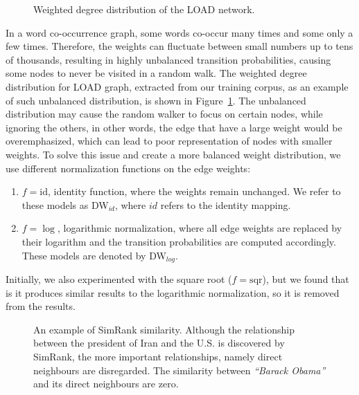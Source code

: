 \begin{figure}
\centering 
\resizebox{0.6\textwidth}{0.6\textwidth}{      

}
\caption{Weighted degree distribution of the LOAD network.}
\label{fig:degrees}
\end{figure}
\noindent
In a word co-occurrence graph, some words co-occur many times and some only a few times. Therefore, the weights can fluctuate between small numbers up to tens of thousands, resulting in highly unbalanced transition probabilities, causing some nodes to never be visited in a random walk. The weighted degree distribution for LOAD graph, extracted from our training corpus, as an example of such unbalanced distribution, is shown in Figure~\ref{fig:degrees}. The unbalanced distribution may cause the random walker to focus on certain nodes, while ignoring the others, in other words, the edge that have a large weight would be overemphasized, which can lead to poor representation of nodes with smaller weights. To solve this issue and create a more balanced weight distribution, we use different normalization functions on the edge weights:
\noindent
\begin{enumerate}
\item  $f=\mathrm{id}$, identity function, where the weights remain unchanged. We refer to these models as DW$_{id}$, where $id$ refers to the identity mapping.
\item  $f=\log$, logarithmic normalization, where all edge weights are replaced by their logarithm and the transition probabilities are computed accordingly. These models are denoted by DW$_{log}$.
\end{enumerate}
Initially, we also experimented with the square root ($f=\mathrm{sqr}$), but we found that is it produces similar results to the logarithmic normalization, so it is removed from the results.\\

\begin{figure}
\centering 
\resizebox{0.50\textwidth}{0.35\textwidth}{      

}
\caption{An example of SimRank similarity. Although the relationship between the president of Iran and the U.S. is discovered by SimRank, the more important relationships, namely direct neighbours are disregarded. The similarity between \emph{``Barack Obama''} and its direct neighbours are zero.}
\label{fig:simrank}
\end{figure}

